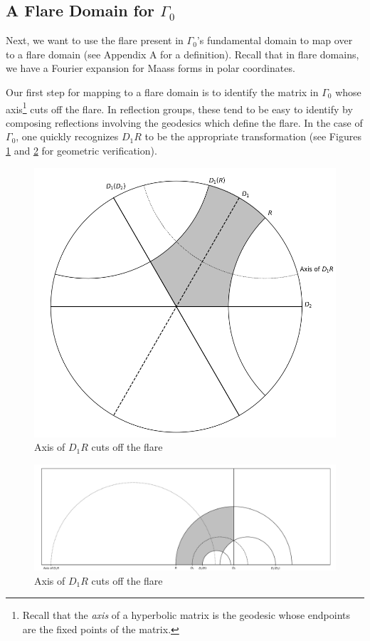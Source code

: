 \documentclass[]{article}
\begin{document}
\subsection*{A Flare Domain for $\Gamma_0$}

Next, we want to use the flare present in $\Gamma_0$'s fundamental domain to map over to a flare domain (see Appendix A for a definition).
Recall that in flare domains, we have a Fourier expansion for Maass forms in polar coordinates.

Our first step for mapping to a flare domain is to identify the matrix in $\Gamma_0$ whose axis\footnote{Recall that the \textit{axis} of a hyperbolic matrix is the geodesic whose endpoints are the fixed points of the matrix.} cuts off the flare.
In reflection groups, these tend to be easy to identify by composing reflections involving the geodesics which define the flare.
In the case of $\Gamma_0$, one quickly recognizes $D_1R$ to be the appropriate transformation (see Figures \ref{cover_with_flare} and \ref{cover_with_flare_UHP} for geometric verification).
\begin{figure}
	\centering
	\includegraphics[width=0.5\linewidth]{cover_with_flare.png}
	\caption{Axis of $D_1R$ cuts off the flare}
	\label{cover_with_flare}
\end{figure}
\begin{figure}
	\centering
	\includegraphics[width=\linewidth]{cover_with_flare_UHP.png}
	\caption{Axis of $D_1R$ cuts off the flare}
	\label{cover_with_flare_UHP}
\end{figure}
\end{document}
